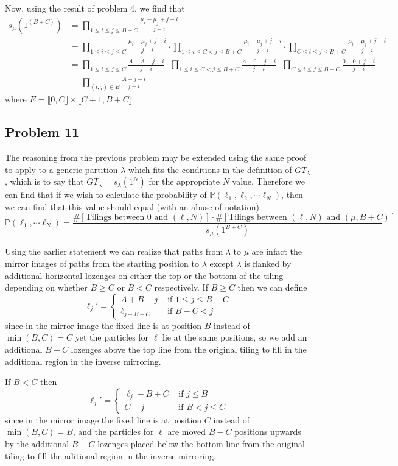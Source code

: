 \documentclass[12pt]{article}
\begin{document}
		Now, using the result of problem 4, we find that 
		\begin{align*}s_\mu(1^{(B+C)})&=\prod_{1\leq i\leq j\leq B+C}\frac{\mu_i-\mu_j+j-i}{j-i}\\
		&=\prod_{1\leq i\leq j \leq C}\frac{\mu_i-\mu_j+j-i}{j-i}\cdot\prod_{1\leq i \leq C<j\leq B+C} \frac{\mu_i-\mu_j+j-i}{j-i} \cdot \prod_{C\leq i\leq j \leq B+C}\frac{\mu_i-\mu_j+j-i}{j-i}\\
		&=\prod_{1\leq i\leq j \leq C}\frac{A-A+j-i}{j-i}\cdot\prod_{1\leq i \leq C<j\leq B+C} \frac{A-0+j-i}{j-i} \cdot \prod_{C\leq i\leq j \leq B+C}\frac{0-0+j-i}{j-i}\\
		&=\prod_{(i,j)\in E} \frac{A+j-i}{j-i}
		\end{align*} where $E=\llbracket{0,C}\rrbracket \times \llbracket C+1, B+C\rrbracket$
	\subsection*{Problem 11}
		The reasoning from the previous problem may be extended using the same proof to apply to a generic partition $\lambda$ which fits the conditions in the definition of $GT_\lambda$, which is to say that $GT_\lambda=s_\lambda(1^N)$ for the appropriate $N$ value.
	 Therefore we can find that if we wish to calculate the probability of $\mathbb{P}(\ell_1, \ell_2,\cdots \ell_N)$, then we can find that this value should equal (with an abuse of notation)\[\mathbb P(\ell_1,\cdots \ell_N)=\frac{\#[\text{Tilings between 0 and }(\ell,N)]\cdot \#[\text{Tilings between } (\ell,N) \text{ and } (\mu,B+C)]}{s_\mu(1^{B+C})}
	\] 
	
	Using the earlier statement we can realize that paths from $\lambda$ to $\mu$ are infact the mirror images of paths from the starting position to $\lambda$ except $\lambda$ is flanked by additional horizontal lozenges on either the top or the bottom of the tiling depending on whether $B\geq C$ or $B<C$ respectively.
	If $B\geq C$ then we can define 
	\[
	\ell_j'=\begin{cases}
	A+B-j &\text{ if } 1\leq j\leq B-C \\ 
	\ell_{j-B+C} &\text{ if } B-C<j
	\end{cases}
	\] 
	since in the mirror image the fixed line is at position $B$ instead of $\min(B,C)=C$ yet the particles for $\ell$ lie at the same positions, so we add an additional $B-C$ lozenges above the top line from the original tiling to fill in the additional region in the inverse mirroring.
	
	If $B<C$ then 
	\[
	\ell_j' = 
	\begin{cases}
	 \ell_j-B+C & \text{ if } j\leq B \\
	 C-j & \text{ if } B<j\leq C
	\end{cases}
	\]
	since in the mirror image the fixed line is at position $C$ instead of $\min(B,C)=B$, and the particles for $\ell$ are moved $B-C$ positions upwards by the additional $B-C$ lozenges placed below the bottom line from the original tiling to fill the aditional region in the inverse mirroring. 
	
\end{document}
